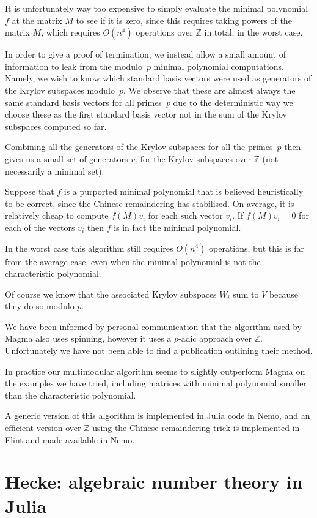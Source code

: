 \documentclass{sig-alternate-05-2015}
\begin{document}
It is unfortunately way too expensive to simply evaluate the minimal
polynomial $f$ at the matrix $M$ to see if it is zero, since this requires
taking powers of the matrix $M$, which requires $O(n^4)$ operations over
$\mathbb{Z}$ in total, in the worst case.

In order to give a proof of termination, we instead allow a small amount of
information to leak from the modulo~$p$ minimal polynomial computations.
Namely, we wish to know which standard basis vectors were used as
generators of the Krylov subspaces modulo~$p$. We observe that these are
almost always the same standard basis vectors for all primes~$p$ due to the
deterministic way we choose these as the first standard basis vector not
in the sum of the Krylov subspaces computed so far. 

Combining all the generators of the Krylov subspaces for all the primes~$p$
then gives us a small set of generators $v_i$ for the Krylov subspaces over
$\mathbb{Z}$ (not necessarily a minimal set).

Suppose that  $f$ is a purported minimal polynomial that is believed
heuristically to be correct, since the Chinese remaindering has stabilised.
On average, it is relatively cheap to compute $f(M)v_i$ for each such
vector $v_i$. If $f(M)v_i = 0$ for each of the vectors $v_i$ then $f$ is
in fact the minimal polynomial.

In the worst case this algorithm still requires $O(n^4)$ operations, but
this is far from the average case, even when the minimal polynomial is not
the characteristic polynomial.

Of course we know that the associated Krylov subspaces $W_i$ sum to $V$
because they do so modulo $p$.

We have been informed by personal communication that the algorithm used by
Magma \cite{magma} also uses spinning, however it uses a $p$-adic
approach over $\mathbb{Z}$. Unfortunately we have not been able to find a
publication outlining their method.

In practice our multimodular algorithm seems to slightly outperform Magma on the
examples we have tried, including matrices with minimal polynomial smaller 
than the characteristic polynomial.

A generic version of this algorithm is implemented in Julia code in Nemo, and
an efficient version over $\mathbb{Z}$ using the Chinese remaindering trick
is implemented in Flint and made available in Nemo.

\section{Hecke: algebraic number theory in Julia}
\end{document}
